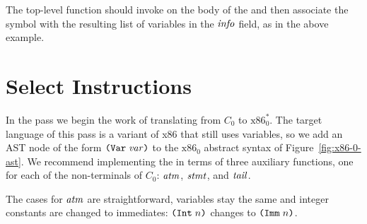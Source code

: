 \documentclass[11pt]{book}
\begin{document}
The top-level  function should invoke
 on the body of the  and then
associate the  symbol with the resulting list of
variables in the $\mathit{info}$ field, as in the above example.

\section{Select Instructions}
\label{sec:select-r1}

In the  pass we begin the work of
translating from $C_0$ to $\text{x86}^{*}_0$. The target language of
this pass is a variant of x86 that still uses variables, so we add an
AST node of the form $\texttt{(Var}\;\mathit{var}\texttt{)}$ to the $\text{x86}_0$ abstract
syntax of Figure~\ref{fig:x86-0-ast}.  We recommend implementing the
 in terms of three auxiliary functions, one
for each of the non-terminals of $C_0$: $\mathit{atm}$, $\mathit{stmt}$, and $\mathit{tail}$.

The cases for $\mathit{atm}$ are straightforward, variables stay
the same and integer constants are changed to immediates:
$\texttt{(Int}\;n\texttt{)}$ changes to $\texttt{(Imm}\;n\texttt{)}$.
\end{document}
